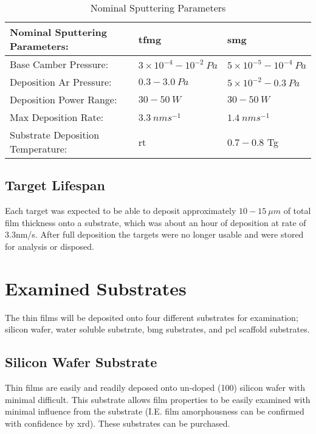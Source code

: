 \documentclass[a4paper,12pt,oneside]{report}%
\begin{document}
\begin{table}[h]
	\centering
	\begin{tabular}{ l l l }
		\toprule
		Nominal Sputtering Parameters: & \acrshort{tfmg} & \acrshort{smg} \\
		\midrule
		Base Camber Pressure: & $3 \times 10^{-4} - 10^{-2}~ Pa$ & $5 \times 10^{-5} - 10^{-4}~ Pa$ \\
		Deposition Ar Pressure:	& $0.3 - 3.0~ Pa$ & $5\times 10^{-2} - 0.3~ Pa$\\
		Deposition Power Range:	& $30 - 50~ W$ & $30 - 50~ W$\\
		Max Deposition Rate: & $3.3~ nm s^{-1}$ & $1.4~ nm s^{-1}$ \\	 
		Substrate Deposition Temperature: & \acrshort{rt} & $0.7 - 0.8$ \acrshort{Tg} \\
		\bottomrule
	\end{tabular}
	\caption{Nominal Sputtering Parameters}
	\label{tab:NomSputterParameters}
\end{table}  	

\subsection{Target Lifespan}
Each target was expected to be able to deposit approximately $10 - 15~ \mu m$ of total film thickness onto a substrate, which was about an hour of deposition at rate of 3.3nm/s. After full deposition the targets were no longer usable and were stored for analysis or disposed. 

\section{Examined Substrates} 
The thin films will be deposited onto four different substrates for examination; silicon wafer, water soluble substrate, \gls{bmg} substrates, and \gls{pcl} scaffold substrates.

\subsection{Silicon Wafer Substrate}
Thin films are easily and readily deposed onto un-doped (100) silicon wafer with minimal difficult. This substrate allows film properties to be easily examined with minimal influence from the substrate (I.E. film amorphousness can be confirmed with confidence by \acrshort{xrd}). These substrates can be purchased. 
\end{document}
